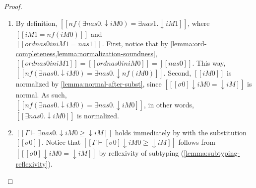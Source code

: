 \begin{proof}
\begin{caseof}
\begin{itemize}
      \begin{enumerate}
        \item By definition, 
          $[[nf(∃nas0.↓iM0) = ∃nas1.↓iM1]]$, 
          where $[[iM1 = nf(iM0)]]$ and \\
          $[[ord {nas0} in iM1 = nas1]]$.
          First, notice that by 
          \cref{lemma:ord-completeness,lemma:normalization-soundness}, 
          $[[ord {nas0} in iM1]] = [[ord {nas0} in iM0]] = [[nas0]]$. 
          This way, $[[nf(∃nas0.↓iM0) = ∃nas0.↓nf(iM0)]]$.
          Second, $[[iM0]]$ is normalized by \cref{lemma:normal-after-subst}, 
          since $[[ [σ0] ↓iM0 = ↓iM ]]$ is normal. 
          As such,\\ $[[nf(∃nas0.↓iM0) = ∃nas0.↓iM0]]$, 
          in other words, $[[∃nas0.↓iM0]]$ is normalized.
        \item $[[Γ ⊢ ∃nas0.↓iM0 ≥ ↓iM]]$ holds immediately by 
           with the substitution 
          $[[σ0]]$. Notice that $[[Γ ⊢ [σ0]↓iM0 ≥ ↓iM]]$
          follows from $[[ [σ0] ↓iM0 = ↓iM ]]$
          by reflexivity of subtyping (\cref{lemma:subtyping-reflexivity}).
      \end{enumerate}



    \end{itemize}
  \end{caseof}
\end{proof}

